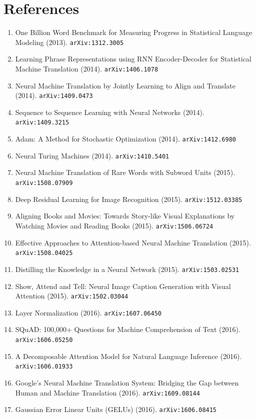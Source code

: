 \documentclass[11pt]{article}
\begin{document}
\section*{References}
\begin{enumerate}\small
  \item One Billion Word Benchmark for Measuring Progress in Statistical
  Language Modeling (2013). \texttt{arXiv:1312.3005}
  \item Learning Phrase Representations using RNN Encoder-Decoder for
  Statistical Machine Translation (2014). \texttt{arXiv:1406.1078}
  \item Neural Machine Translation by Jointly Learning to Align and Translate (2014). \texttt{arXiv:1409.0473}
  \item Sequence to Sequence Learning with Neural Networks (2014). \texttt{arXiv:1409.3215}
  \item Adam: A Method for Stochastic Optimization (2014). \texttt{arXiv:1412.6980}
  \item Neural Turing Machines (2014). \texttt{arXiv:1410.5401}
  \item Neural Machine Translation of Rare Words with Subword Units (2015). \texttt{arXiv:1508.07909}
  \item Deep Residual Learning for Image Recognition (2015). \texttt{arXiv:1512.03385}
  \item Aligning Books and Movies: Towards Story-like Visual Explanations by
  Watching Movies and Reading Books (2015). \texttt{arXiv:1506.06724}
  \item Effective Approaches to Attention-based Neural Machine Translation (2015). \texttt{arXiv:1508.04025}
  \item Distilling the Knowledge in a Neural Network (2015). \texttt{arXiv:1503.02531}
  \item Show, Attend and Tell: Neural Image Caption Generation with Visual
  Attention (2015). \texttt{arXiv:1502.03044}
  \item Layer Normalization (2016). \texttt{arXiv:1607.06450}
  \item SQuAD: 100,000+ Questions for Machine Comprehension of Text (2016). \texttt{arXiv:1606.05250}
  \item A Decomposable Attention Model for Natural Language Inference (2016). \texttt{arXiv:1606.01933}
  \item Google's Neural Machine Translation System: Bridging the Gap between
  Human and Machine Translation (2016). \texttt{arXiv:1609.08144}
  \item Gaussian Error Linear Units (GELUs) (2016). \texttt{arXiv:1606.08415}

\end{enumerate}
\end{document}
